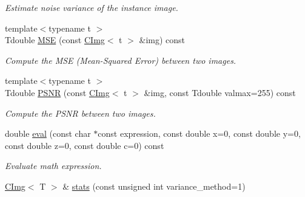 \begin{DoxyCompactItemize}
\begin{DoxyCompactList}\small\item\em Estimate noise variance of the instance image. \item\end{DoxyCompactList}\item 
\hypertarget{structcimg__library_1_1CImg_adf53b8b068056b8cdace6cbdefa23c7c}{
{\footnotesize template$<$typename t $>$ }\\Tdouble \hyperlink{structcimg__library_1_1CImg_adf53b8b068056b8cdace6cbdefa23c7c}{MSE} (const \hyperlink{structcimg__library_1_1CImg}{CImg}$<$ t $>$ \&img) const }
\label{structcimg__library_1_1CImg_adf53b8b068056b8cdace6cbdefa23c7c}

\begin{DoxyCompactList}\small\item\em Compute the MSE (Mean-\/Squared Error) between two images. \item\end{DoxyCompactList}\item 
\hypertarget{structcimg__library_1_1CImg_a9a0696988fa18f6db81db2524d89c2ee}{
{\footnotesize template$<$typename t $>$ }\\Tdouble \hyperlink{structcimg__library_1_1CImg_a9a0696988fa18f6db81db2524d89c2ee}{PSNR} (const \hyperlink{structcimg__library_1_1CImg}{CImg}$<$ t $>$ \&img, const Tdouble valmax=255) const }
\label{structcimg__library_1_1CImg_a9a0696988fa18f6db81db2524d89c2ee}

\begin{DoxyCompactList}\small\item\em Compute the PSNR between two images. \item\end{DoxyCompactList}\item 
double \hyperlink{structcimg__library_1_1CImg_a9e3106298c24c89ebd21e619fd409a8e}{eval} (const char $\ast$const expression, const double x=0, const double y=0, const double z=0, const double c=0) const 
\begin{DoxyCompactList}\small\item\em Evaluate math expression. \item\end{DoxyCompactList}\item 
\hypertarget{structcimg__library_1_1CImg_aaf59bb4a64bfcba6082253a48a88c9d6}{
\hyperlink{structcimg__library_1_1CImg}{CImg}$<$ T $>$ \& \hyperlink{structcimg__library_1_1CImg_aaf59bb4a64bfcba6082253a48a88c9d6}{stats} (const unsigned int variance\_\-method=1)}
\label{structcimg__library_1_1CImg_aaf59bb4a64bfcba6082253a48a88c9d6}


\end{DoxyCompactItemize}
